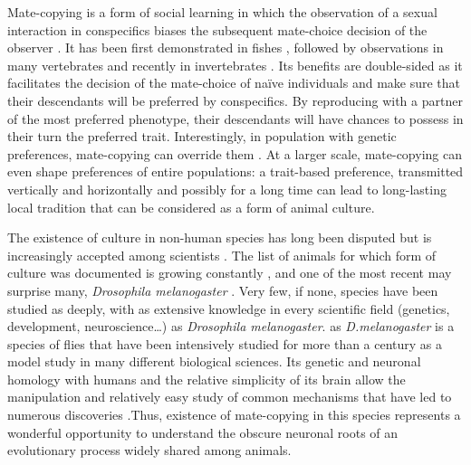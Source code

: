 \documentclass[a4paper, 12pt]{article}
\begin{document}
Mate-copying is a form of social learning in which the observation of a sexual interaction in conspecifics biases the subsequent mate-choice decision of the observer \parencite{brown_fish_2011}. It has been first demonstrated in fishes \parencite{dugatkin_lee_alan_reversal_1992}, followed by observations in many vertebrates \parencite{galef_mate-choice_1998, yorzinski_same-sex_2010} and recently in invertebrates \parencite{mery_public_2009, fowler-finn_complexities_2015}. Its benefits are double-sided as  it facilitates the decision of the mate-choice of naïve individuals and make sure that their descendants will be preferred by conspecifics. By reproducing with a partner of the most preferred phenotype, their descendants will have chances to possess in their turn the preferred trait.
Interestingly, in population with genetic preferences, mate-copying can override them \parencite{dugatkin_interface_1996, witte_male_1998}. At a larger scale, mate-copying can even shape preferences of entire populations: a trait-based preference, transmitted vertically and horizontally and possibly for a long time can lead to long-lasting local tradition that can be considered as a form of animal culture\parencite{brooks_importance_1998, danchin_cultural_2018}.

The existence of culture in non-human species has long been disputed \parencite{laland_animals_2003} but is increasingly accepted among scientists \parencite{aplin_experimentally_2015, whitehead_geneculture_2017}. The list of animals for which form of culture was documented is growing constantly \parencite{van_schaik_orangutan_2003, thornton_alex_multi-generational_2010, whiten_culture_2017} , and one of the most recent may surprise many, \textit{Drosophila melanogaster} \parencite{danchin_cultural_2018}.  Very few, if none, species have been studied as deeply, with as extensive knowledge in every scientific field (genetics, development, neuroscience…) as \textit{Drosophila melanogaster}. as \textit{D.melanogaster} is a species of flies that have been intensively studied for more than a century as a model study in many different biological sciences. Its genetic and neuronal homology with humans and the relative simplicity of its brain allow the manipulation and relatively easy study of common mechanisms that have led to numerous discoveries \parencite{bellen_100_2010, ugur_drosophila_2016, hewitt_mechanisms_2017}.Thus, existence of mate-copying in this species represents a wonderful opportunity to understand the obscure neuronal roots of an evolutionary process widely shared among animals.  
\end{document}
